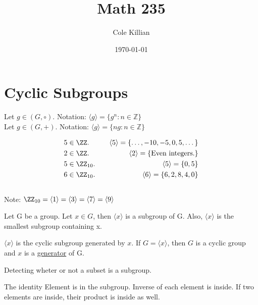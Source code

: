 \documentclass[11pt]{scrartcl}
\title{Math 235}
\date{\today}
\author{Cole Killian}
\begin{document}
\maketitle

\clearpage
\tableofcontents
\clearpage

\section{Cyclic Subgroups}

\begin{note}
  \hfill \newline
  Let $g \in (G, \circ)$. Notation: $\langle g\rangle = \{g^n: n \in \mathbb{Z}\}$ \\
  Let $g \in (G, +)$. Notation: $\langle g\rangle  = \{ng: n \in \mathbb{Z}\}$
\end{note}

\begin{example}
  \begin{align*}
    5 & \in \ZZ. & \quad\langle 5 \rangle = \{ \dots, -10, -5, 0, 5, \dots \} \\
    2 & \in \ZZ. & \quad\langle 2 \rangle = \{\text{Even integers.}\} \\
    5 & \in \ZZ_{10}. & \quad\langle 5 \rangle = \{0, 5\} \\
    6 & \in \ZZ_{10}. & \quad\langle 6 \rangle = \{6, 2, 8, 4, 0\} \\ \\
  \end{align*}
  Note: $\ZZ_{10} = \langle 1 \rangle = \langle 3 \rangle = \langle 7 \rangle = \langle 9 \rangle $
\end{example}

\begin{theorem}
  Let G be a group. Let $x \in G$, then $\langle x \rangle$ is a subgroup of G. Also, $\langle x \rangle$ is the smallest subgroup containing x.
\end{theorem}

\begin{definition}
  $\langle x \rangle$ is the cyclic subgroup generated by $x$. If $G = \langle x \rangle$, then $G$ is a cyclic group and $x$ is a \ul{generator} of G.
\end{definition}

\begin{definition}
  Detecting wheter or not a subset is a subgroup.
  \begin{enumerate}
    \ii
    The identity Element is in the subgroup.
    \ii
    Inverse of each element is inside.
    \ii
    If two elements are inside, their product is inside as well.
  \end{enumerate}
\end{definition}
\end{document}
